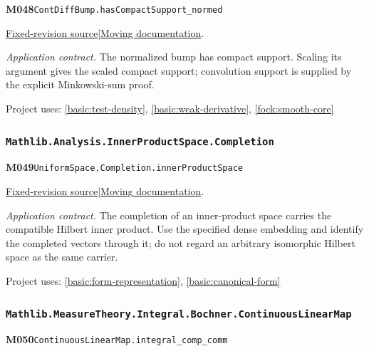 \documentclass[11pt,a4paper]{article}
\theoremstyle{definition}
\theoremstyle{remark}
\begin{document}
\noindent\textbf{M048}\label{base:M048}\quad\nolinkurl{ContDiffBump.hasCompactSupport_normed}

\href{https://github.com/leanprover-community/mathlib4/blob/9bac2d0692944a775113f7c130fd5e5b4608a854/Mathlib/Analysis/Calculus/BumpFunction/Normed.lean}{Fixed-revision source}\quad|\quad\href{https://leanprover-community.github.io/mathlib4_docs/Mathlib/Analysis/Calculus/BumpFunction/Normed.html#ContDiffBump.hasCompactSupport_normed}{Moving documentation}.\par
\noindent\textit{Application contract.} The normalized bump has compact support. Scaling its argument gives the scaled compact support; convolution support is supplied by the explicit Minkowski-sum proof.\par
{\small Project uses: \ref{basic:test-density}, \ref{basic:weak-derivative}, \ref{fock:smooth-core}}\par\medskip

\subsubsection*{\nolinkurl{Mathlib.Analysis.InnerProductSpace.Completion}}
\noindent\textbf{M049}\label{base:M049}\quad\nolinkurl{UniformSpace.Completion.innerProductSpace}

\href{https://github.com/leanprover-community/mathlib4/blob/9bac2d0692944a775113f7c130fd5e5b4608a854/Mathlib/Analysis/InnerProductSpace/Completion.lean}{Fixed-revision source}\quad|\quad\href{https://leanprover-community.github.io/mathlib4_docs/Mathlib/Analysis/InnerProductSpace/Completion.html#UniformSpace.Completion.innerProductSpace}{Moving documentation}.\par
\noindent\textit{Application contract.} The completion of an inner-product space carries the compatible Hilbert inner product. Use the specified dense embedding and identify the completed vectors through it; do not regard an arbitrary isomorphic Hilbert space as the same carrier.\par
{\small Project uses: \ref{basic:form-representation}, \ref{basic:canonical-form}}\par\medskip

\subsubsection*{\nolinkurl{Mathlib.MeasureTheory.Integral.Bochner.ContinuousLinearMap}}
\noindent\textbf{M050}\label{base:M050}\quad\nolinkurl{ContinuousLinearMap.integral_comp_comm}
\end{document}
